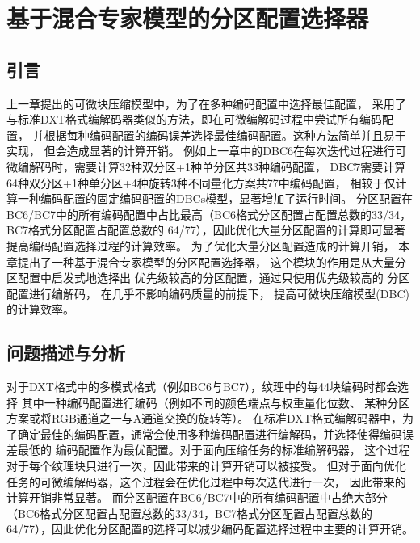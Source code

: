 
\chapter{基于混合专家模型的分区配置选择器}

\section{引言}

上一章提出的可微块压缩模型中，为了在多种编码配置中选择最佳配置，
采用了与标准DXT格式编解码器类似的方法，即在可微编解码过程中尝试所有编码配置，
并根据每种编码配置的编码误差选择最佳编码配置。这种方法简单并且易于实现，
但会造成显著的计算开销。
例如上一章中的DBC6在每次迭代过程进行可微编解码时，需要计算32种双分区+1种单分区共33种编码配置，
DBC7需要计算64种双分区+1种单分区+4种旋转\times3种不同量化方案共77中编码配置，
相较于仅计算一种编码配置的固定编码配置的DBCs模型，显著增加了运行时间。
分区配置在BC6/BC7中的所有编码配置中占比最高（BC6格式分区配置占配置总数的33/34，BC7格式分区配置占配置总数的
64/77），因此优化大量分区配置的计算即可显著提高编码配置选择过程的计算效率。
为了优化大量分区配置造成的计算开销，
本章提出了一种基于混合专家模型的分区配置选择器，
这个模块的作用是从大量分区配置中启发式地选择出
优先级较高的分区配置，通过只使用优先级较高的
分区配置进行编解码，
在几乎不影响编码质量的前提下，
提高可微块压缩模型(DBC)的计算效率。

\section{问题描述与分析}

对于DXT格式中的多模式格式（例如BC6与BC7），纹理中的每4\times4块编码时都会选择
其中一种编码配置进行编码（例如不同的颜色端点与权重量化位数、
某种分区方案或将RGB通道之一与A通道交换的旋转等）。
在标准DXT格式编解码器中，为了确定最佳的编码配置，通常会使用多种编码配置进行编解码，并选择使得编码误差最低的
编码配置作为最优配置。对于面向压缩任务的标准编解码器，
这个过程对于每个纹理块只进行一次，因此带来的计算开销可以被接受。
但对于面向优化任务的可微编解码器，这个过程会在优化过程中每次迭代进行一次，
因此带来的计算开销非常显著。
而分区配置在BC6/BC7中的所有编码配置中占绝大部分（BC6格式分区配置占配置总数的33/34，BC7格式分区配置占配置总数的
64/77），因此优化分区配置的选择可以减少编码配置选择过程中主要的计算开销。

